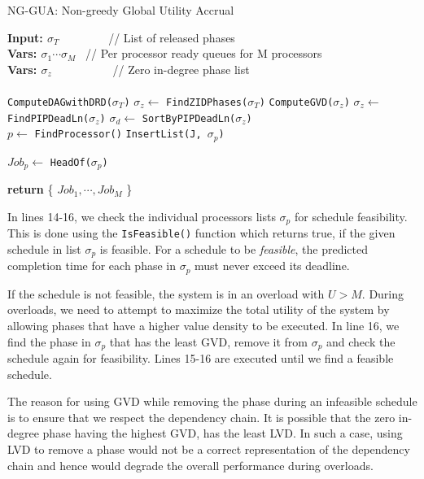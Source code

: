 \documentclass[12pt,dvips]{report}
\renewcommand{\baselinestretch}{1}
\begin{document}
\linesnumbered
\renewcommand{\baselinestretch}{1.0}
\SetAlFnt{\footnotesize}
\begin{algorithm2e}[!t]	
    \caption{NG-GUA: Non-greedy Global Utility Accrual}
    \label{alg:NGGUA}
     \textbf{Input: $\sigma_T$} ~~~~~~~~// List of released phases\\
     \textbf{Vars: $\sigma_1 \cdots \sigma_M$} ~// Per processor ready queues for M  processors \\
     \textbf{Vars: $\sigma_{z}$} ~~~~~~~~~~// Zero in-degree phase list \\
	~\\
	\texttt{ComputeDAGwithDRD($\sigma_T$)}\;		
	$\sigma_{z}\leftarrow$ \texttt{FindZIDPhases($\sigma_T$)}\;
	\texttt{ComputeGVD($\sigma_z$)}\;	
	$\sigma_{z}\leftarrow$ \texttt{FindPIPDeadLn($\sigma_{z}$)}\;
	$\sigma_{d}\leftarrow$ \texttt{SortByPIPDeadLn($\sigma_{z}$)}\;
	~\\
	 {
		$p\leftarrow$ \texttt{FindProcessor()}\;
		\texttt{InsertList(J, $\sigma_p$)}\;
	}
	
	 {
		$Job_p\leftarrow$ \texttt{HeadOf($\sigma_p$)} \;
	}

    \textbf{return} \{ $Job_1, \cdots , Job_M $ \}\;
\end{algorithm2e}    

In lines 14-16, we check the individual processors lists $\sigma_p$ for schedule feasibility. This is done using the \texttt{IsFeasible()} function which returns true, if the given schedule in list $\sigma_p$ is feasible. For a schedule to be \textit{feasible}, the predicted completion time for each phase in $\sigma_p$ must never exceed its deadline. 

If the schedule is not feasible, the system is in an overload with $U > M$. During overloads, we need to attempt to maximize the total utility of the system by allowing phases that have a higher value density to be executed. In line 16, we find the phase in $\sigma_p$ that has the least GVD, remove it from $\sigma_p$ and check the schedule again for feasibility. Lines 15-16 are executed until we find a feasible schedule.

The reason for using GVD while removing the phase during an infeasible schedule is to ensure that we respect the dependency chain. It is possible that the zero in-degree phase having the highest GVD, has the least LVD. In such a case, using LVD to remove a phase would not be a correct representation of the dependency chain and hence would degrade the overall performance during overloads.
\end{document}
